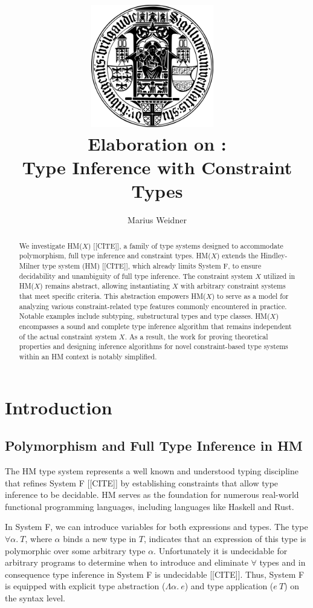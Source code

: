 \documentclass[runningheads]{llncs}
\title{\includegraphics[width=0.4\textwidth]{logo.png}~\\[1cm] Elaboration on
  \hmx:\\Type Inference with Constraint Types}
\institute{Chair of Programming Languages, University of Freiburg \\
  \email{weidner@cs.uni-freiburg.de}}
\author{Marius Weidner}
\newcommand{\hmx}{HM($X$)}
\begin{document}
\let\oldaddcontentsline\addcontentsline{}
\def\addcontentsline#1#2#3{}
\maketitle
\def\addcontentsline#1#2#3{\oldaddcontentsline{#1}{#2}{#3}}

\begin{abstract}
  We investigate \hmx{} [[CITE]], a family of type systems designed to
  accommodate
  polymorphism, full type inference and constraint types.
  \hmx{} extends the Hindley-Milner type system (HM) [[CITE]], which already
  limits
  System F, to ensure decidability and unambiguity of full type inference.
  The constraint system $X$ utilized in \hmx{} remains abstract, allowing
  instantiating $X$ with arbitrary constraint systems that meet specific
  criteria.
  This abstraction empowers \hmx{} to serve as a model for analyzing various
  constraint-related type features commonly encountered in practice.
  Notable examples include subtyping, substructural
  types and type classes.
  \hmx{} encompasses a sound and complete type inference algorithm that remains
  independent of the actual constraint system
  $X$.
  As a result, the work for proving theoretical properties and designing
  inference algorithms for novel constraint-based type systems within an
  HM context is notably simplified.
\end{abstract}

\setcounter{tocdepth}{2}
\tableofcontents
\newpage

\section{Introduction}
\subsection{Polymorphism and Full Type Inference in HM}
The HM type system represents a well known and understood typing discipline
that
refines System F [[CITE]] by establishing constraints that allow type inference
to be decidable.
HM serves as the foundation for numerous real-world functional programming
languages, including languages like Haskell and Rust.

In System F, we can introduce variables for both expressions and types.
The type $∀α. \ T$, where $α$ binds a new type in $T$,
indicates that an expression of this type is polymorphic over some
arbitrary type $α$.
Unfortunately it is undecidable for arbitrary programs to determine when to
introduce and eliminate $∀$ types and in consequence type inference in System F
is undecidable [[CITE]].
Thus, System F is equipped with explicit type abstraction ($Λα. \ e$)
and type
application ($e \ T$) on the syntax level.
\end{document}
